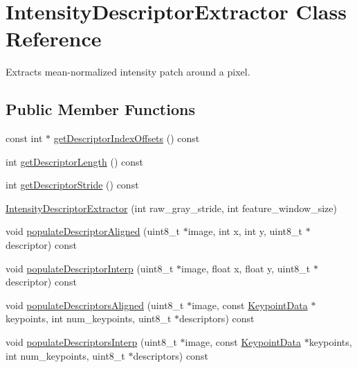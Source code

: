 \hypertarget{classfovis_1_1IntensityDescriptorExtractor}{
\section{IntensityDescriptorExtractor Class Reference}
\label{classfovis_1_1IntensityDescriptorExtractor}
}


Extracts mean-\/normalized intensity patch around a pixel.  


\subsection*{Public Member Functions}
\begin{DoxyCompactItemize}
\item 
const int $\ast$ \hyperlink{classfovis_1_1IntensityDescriptorExtractor_acb4a60e9159801a3486dd6f2081cf346}{getDescriptorIndexOffsets} () const 
\item 
int \hyperlink{classfovis_1_1IntensityDescriptorExtractor_ace19c8012ae7eaa4db2f807167b165f9}{getDescriptorLength} () const 
\item 
int \hyperlink{classfovis_1_1IntensityDescriptorExtractor_ab19595fa4e4bb6716f9ed7fa38a297b2}{getDescriptorStride} () const 
\item 
\hyperlink{classfovis_1_1IntensityDescriptorExtractor_ae89b1246e1e1a199bfcf70ce8e194f97}{IntensityDescriptorExtractor} (int raw\_\-gray\_\-stride, int feature\_\-window\_\-size)
\item 
void \hyperlink{classfovis_1_1IntensityDescriptorExtractor_a6741482f67c7acc2bbc6a45aa3e562b4}{populateDescriptorAligned} (uint8\_\-t $\ast$image, int x, int y, uint8\_\-t $\ast$descriptor) const 
\item 
void \hyperlink{classfovis_1_1IntensityDescriptorExtractor_aa1ad51fea7d5c44c9d1588a821ebafcd}{populateDescriptorInterp} (uint8\_\-t $\ast$image, float x, float y, uint8\_\-t $\ast$descriptor) const 
\item 
void \hyperlink{classfovis_1_1IntensityDescriptorExtractor_a78ac9f581501370c62b5213ebba152fa}{populateDescriptorsAligned} (uint8\_\-t $\ast$image, const \hyperlink{classfovis_1_1KeypointData}{KeypointData} $\ast$keypoints, int num\_\-keypoints, uint8\_\-t $\ast$descriptors) const 
\item 
void \hyperlink{classfovis_1_1IntensityDescriptorExtractor_a6f626ae691f4031726a17453b3cce95c}{populateDescriptorsInterp} (uint8\_\-t $\ast$image, const \hyperlink{classfovis_1_1KeypointData}{KeypointData} $\ast$keypoints, int num\_\-keypoints, uint8\_\-t $\ast$descriptors) const 
\end{DoxyCompactItemize}


